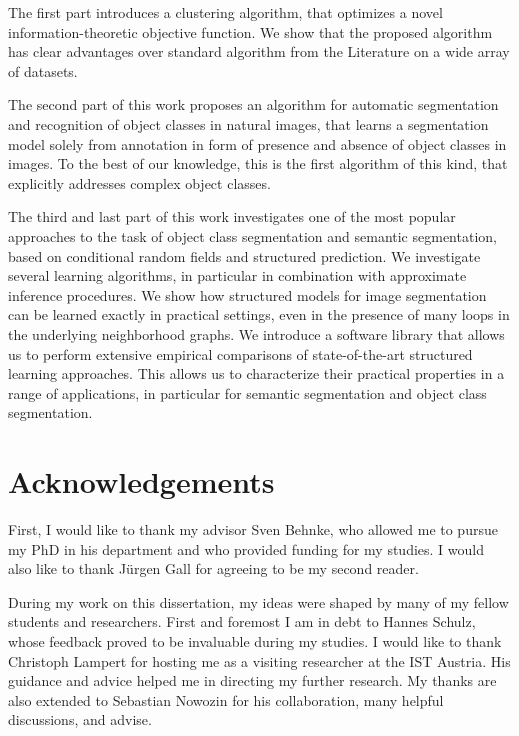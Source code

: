 \documentclass[12pt,toc=bibnumbered, a4paper,twoside,DIV=11,BCOR=.5cm]{scrbook}
\begin{document}
The first part introduces a clustering algorithm, that optimizes a novel information-theoretic
objective function. We show that the proposed algorithm has clear advantages over standard algorithm
from the Literature on a wide array of datasets.

The second part of this work proposes an algorithm for automatic segmentation
and recognition of object classes in natural images, that learns a segmentation model solely from
annotation in form of presence and absence of object classes in images. To the best of our knowledge,
this is the first algorithm of this kind, that explicitly addresses complex object classes.

The third and last part of this work investigates one of the most popular
approaches to the task of object class segmentation and semantic segmentation,
based on conditional random fields and structured prediction.
%
%
We investigate several learning algorithms, in particular in combination with
approximate inference procedures. We show how structured models for image
segmentation can be learned exactly in practical settings, even in the presence
of many loops in the underlying neighborhood graphs.  We introduce a software
library that allows us to perform extensive empirical comparisons of
state-of-the-art structured learning approaches. This allows us to characterize
their practical properties in a range of applications, in particular for
semantic segmentation and object class segmentation.


\chapter*{Acknowledgements}
First, I would like to thank my advisor Sven Behnke, who allowed me
to pursue my PhD in his department and who provided funding for my studies.
I would also like to thank J\"urgen Gall for agreeing to be my second reader.

During my work on this dissertation, my ideas were shaped by many of my fellow
students and researchers. First and foremost I am in debt to Hannes Schulz,
whose feedback proved to be invaluable during my studies.
I would like to thank Christoph Lampert for hosting me as a visiting researcher
at the IST Austria. His guidance and advice helped me in directing my further
research. My thanks are also extended to Sebastian Nowozin for his collaboration,
many helpful discussions, and advise.
\end{document}
